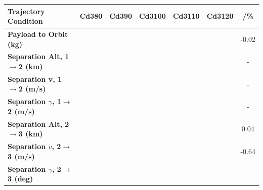 \begin{table}[ht]
	\centering
	\begin{tabular}{l c c c c c c} 
		\hline \textbf{Trajectory Condition}
		&Cd380
		&Cd390
		&Cd3100
		&Cd3110
		&Cd3120
		& /\%
		\\
		\hline \textbf{Payload to Orbit (kg)}
		& \PayloadToOrbitCdThreeEightyNoReturn
		& \PayloadToOrbitCdThreeNinetyNoReturn
		& \PayloadToOrbitCdThreeStandardNoReturn
		& \PayloadToOrbitCdThreeOneHundredTenNoReturn
		& \PayloadToOrbitCdThreeOneHundredTwentyNoReturn
		&-0.02
		\\
		\textbf{Separation Alt, 1$\rightarrow$2 (km)}
		& \firstsecondSeparationAltCdThreeEightyNoReturn
		& \firstsecondSeparationAltCdThreeNinetyNoReturn
		& \firstsecondSeparationAltCdThreeStandardNoReturn
		& \firstsecondSeparationAltCdThreeOneHundredTenNoReturn
		& \firstsecondSeparationAltCdThreeOneHundredTwentyNoReturn
		& -
		\\
		\textbf{Separation v, 1$\rightarrow$2 (m/s)}
		& \firstsecondSeparationvCdThreeEightyNoReturn
		& \firstsecondSeparationvCdThreeNinetyNoReturn
		& \firstsecondSeparationvCdThreeStandardNoReturn
		& \firstsecondSeparationvCdThreeOneHundredTenNoReturn
		& \firstsecondSeparationvCdThreeOneHundredTwentyNoReturn
		& -
		\\
		\textbf{Separation $\gamma$, 1$\rightarrow$2 (m/s)}
		& \firstsecondSeparationgammaCdThreeEightyNoReturn
		& \firstsecondSeparationgammaCdThreeNinetyNoReturn
		& \firstsecondSeparationgammaCdThreeStandardNoReturn
		& \firstsecondSeparationgammaCdThreeOneHundredTenNoReturn
		& \firstsecondSeparationgammaCdThreeOneHundredTwentyNoReturn
		& -
		\\
		\textbf{Separation Alt, 2$\rightarrow$3 (km)}
		& \secondthirdSeparationAltCdThreeEightyNoReturn
		& \secondthirdSeparationAltCdThreeNinetyNoReturn
		& \secondthirdSeparationAltCdThreeStandardNoReturn
		& \secondthirdSeparationAltCdThreeOneHundredTenNoReturn
		& \secondthirdSeparationAltCdThreeOneHundredTwentyNoReturn
		&0.04
		\\
		\textbf{Separation $v$, 2$\rightarrow$3 (m/s)}
		& \secondthirdSeparationvCdThreeEightyNoReturn
		& \secondthirdSeparationvCdThreeNinetyNoReturn
		& \secondthirdSeparationvCdThreeStandardNoReturn
		& \secondthirdSeparationvCdThreeOneHundredTenNoReturn
		& \secondthirdSeparationvCdThreeOneHundredTwentyNoReturn
		&-0.64
		\\
		\textbf{Separation $\gamma$, 2$\rightarrow$3 (deg)}
		& \secondthirdSeparationgammaCdThreeEightyNoReturn
		& \secondthirdSeparationgammaCdThreeNinetyNoReturn

\end{tabular}
\end{table}
